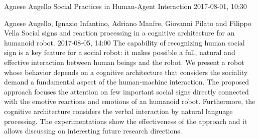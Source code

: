 \documentclass[10pt,fleqn,openany]{book} %
\begin{document}
\begin{enumerate}
		
		\paperabstract
		{Agnese Augello}
		{Social Practices in Human-Agent Interaction}
		{2017-08-01, 10:30}
		{}
		
		
		\paperabstract
		{Agnese Augello, Ignazio Infantino, Adriano Manfre, Giovanni Pilato and Filippo Vella}
		{Social signs and reaction processing in a cognitive architecture for an humanoid robot.}
		{2017-08-05, 14:00}
		{The capability of recognizing human social sign is a key feature for a social robot: it makes possible a full, natural and effective interaction between human beings and the robot. We present a robot whose behavior depends on a cognitive architecture that considers the sociality demand a fundamental aspect of the human-machine interaction. The proposed approach focuses the attention on few important social signs directly connected with the emotive reactions and emotions of an humanoid robot. Furthermore, the cognitive architecture considers the verbal interaction by natural language processing. The experimentations show the effectiveness of the approach and it allows discussing on interesting future research directions.}
		

\end{enumerate}
\end{document}
